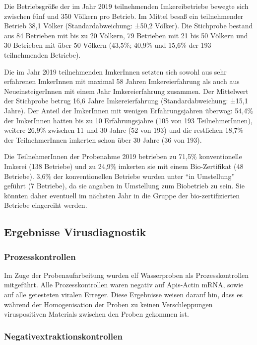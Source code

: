 Die Betriebsgröße der im Jahr 2019 teilnehmenden Imkereibetriebe bewegte sich zwischen fünf und 350 Völkern pro Betrieb. Im Mittel besaß ein teilnehmender Betrieb 38,1 Völker (Standardabweichung: ±50,2 Völker). Die Stichprobe bestand aus 84 Betrieben mit bis zu 20 Völkern, 79 Betrieben mit 21 bis 50 Völkern und 30 Betrieben mit über 50 Völkern (43,5\%; 40,9\% und 15,6\% der 193 teilnehmenden Betriebe).

Die im Jahr 2019 teilnehmenden ImkerInnen setzten sich sowohl aus sehr erfahrenen ImkerInnen mit maximal 58 Jahren Imkereierfahrung als auch aus NeueinsteigerInnen mit einem Jahr Imkereierfahrung zusammen. Der Mittelwert der Stichprobe betrug 16,6 Jahre Imkereierfahrung (Standardabweichung: ±15,1 Jahre). Der Anteil der ImkerInnen mit wenigen Erfahrungsjahren überwog: 54,4\% der ImkerInnen hatten bis zu 10 Erfahrungsjahre (105 von 193 TeilnehmerInnen), weitere 26,9\% zwischen 11 und 30 Jahre (52 von 193) und die restlichen 18,7\% der TeilnehmerInnen imkerten schon über 30 Jahre (36 von 193). 

Die TeilnehmerInnen der Probenahme 2019 betrieben zu 71,5\% konventionelle Imkerei (138 Betriebe) und zu 24,9\% imkerten sie mit einem Bio-Zertifikat (48 Betriebe). 3,6\% der konventionellen Betriebe wurden unter \enquote{in Umstellung} geführt (7 Betriebe), da sie angaben in Umstellung zum Biobetrieb zu sein. Sie könnten daher eventuell im nächsten Jahr in die Gruppe der bio-zertifizierten Betriebe eingereiht werden.

\subsection{Ergebnisse Virusdiagnostik}

\subsubsection{Prozesskontrollen}
\label{chap:prozesskontrollen}

Im Zuge der Probenaufarbeitung wurden elf Wasserproben als Prozesskontrollen mitgeführt. Alle Prozesskontrollen waren negativ auf Apis-Actin mRNA, sowie auf alle getesteten viralen Erreger. Diese Ergebnisse weisen darauf hin, dass es während der Homogenisation der Proben zu keinen Verschleppungen viruspositiven Materials zwischen den Proben gekommen ist.

\subsubsection{Negativextraktionskontrollen}
\label{chap:negativkontrollen}

